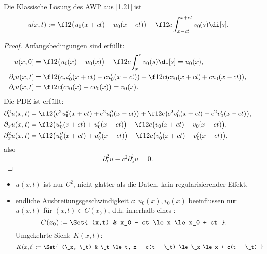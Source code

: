 \begin{st}[Existenz für AWP der Wellengl., d'Alembert'sche Formel, $d = 1$] \label{1.22}
	Die Klassische Lösung des AWP aus \ref{1.21} ist
	\[
		u(x,t) := \f 12 \big( u_0(x  + ct) + u_0(x-ct)\big) + \f 1{2c} \int_{x-ct}^{x+ct} v_0(s) \di[s].
	\]
	\begin{proof}
		Anfangsbedingungen sind erfüllt:
		\begin{align*}
			u(x,0) &= \f 12 \big(u_0(x) + u_0(x)\big) + \f 1{2c} \int_x^x v_0(s) \di[s] = u_0(x), \\
			\partial_t u(x,t) &= \f 12 (c_i u_0'(x+ct) -cu_0'(x-ct)) + \f 1{2c}( c v_0(x+ct) + cv_0(x-ct)), \\
			\partial_t u(x,t) &= \f 1{2c} (c v_0(x) + c v_0(x)) = v_0(x).
		\end{align*}
		Die PDE ist erfüllt:
		\begin{align*}
			\partial_t^2 u(x,t) &= \f 12 \big(c^2 u_0''(x+ct) + c^2 u_0''(x-ct)\big) + \f 1{2c} \big( c^2 v_0'(x+ct) - c^2 v_0'(x-ct) \big), \\
			\partial_x u(x,t) &= \f 12 \big(u_0'(x + ct) + u_0'(x-ct)\big) + \f 1{2c} \big( v_0(x+ct) - v_0(x-ct) \big), \\
			\partial_x^2 u(x,t) &= \f 12 \big(u_0''(x+ct) + u_0''(x-ct)\big) + \f 1{2c} \big( v_0'(x+ct) - v_0'(x-ct) \big),
		\end{align*}
		also
		\[
			\partial_t^2 u - c^2 \partial_x^2 u
			= 0.
		\]
	\end{proof}
	\begin{note}
		\begin{itemize}
			\item
				$u(x,t)$ ist nur $C^2$, nicht glatter als die Daten, kein regularisierender Effekt,
			\item
				endliche Ausbreitungsgeschwindigkeit $c$:
				$u_0(x), v_0(x)$ beeinflussen nur $u(x,t)$ für $(x,t) \in C(x_0)$, d.h. innerhalb eines :
				\[
					C(x_0) := \Set{ (x,t) & x_0 - ct \le x \le x_0 + ct }.
				\]
				Umgekehrte Sicht:  $K(x,t)$:
				\[
					K(x,t) := \Set{ (\_x, \_t) & \_t \le t, x - c(t - \_t) \le \_x \le x + c(t - \_t) }
				\]
		\end{itemize}
	\end{note}
\end{st}

